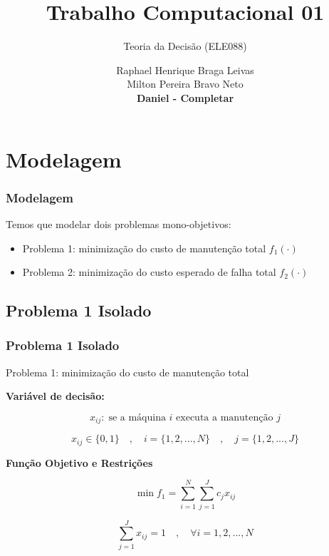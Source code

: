 \documentclass{beamer}
\title[Short Paper Title]  
{Trabalho Computacional 01}
\subtitle
{Teoria da Decisão (ELE088)}
\author 
 { Raphael Henrique Braga Leivas \\
 Milton Pereira Bravo Neto \\ 
 \textbf{Daniel - Completar}}
\institute 
{
Curso de Bacharelado em Engenharia de Sistemas\\
Universidade Federal de Minas Gerais
}
\date{}
\newcommand{\un}[1]{\;\text{#1}}
\begin{document}
\begin{frame}
    \titlepage
\end{frame}

\section{Modelagem}

    \begin{frame}
        \frametitle{Modelagem}
        Temos que modelar dois problemas mono-objetivos:
        \vspace{1cm}

        \begin{itemize}
            \item Problema 1: minimização do custo de manutenção total $f_1 (\cdot)$
             \vspace{1cm}
            \item Problema 2: minimização do custo esperado de falha total $f_2 (\cdot)$
        \end{itemize}
    \end{frame}

    \subsection{Problema 1 Isolado}
    \begin{frame}
        \frametitle{Problema 1 Isolado}

        \begin{center}
            Problema 1: minimização do custo de manutenção total
        \end{center}

        \vspace{0.5cm}

        \textbf{Variável de decisão:}

        \[  x_{ij}: \un{se a máquina $i$ executa a manutenção $j$}  \]
        
        \[ x_{ij} \in \{0,1\} \quad , \quad i = \{1, 2, ..., N\}  \quad , \quad j = \{1, 2, ..., J\} \]

        \vspace{0.5cm}

        \textbf{Função Objetivo e Restrições}

        \[  \min f_1 = \sum_{i=1}^{N} \sum_{j=1}^{J} c_j x_{ij} \]

        \[ \sum_{j=1}^{J} x_{ij} = 1 \quad , \quad \forall i = {1, 2, ..., N} \]
    \end{frame}
\end{document}
